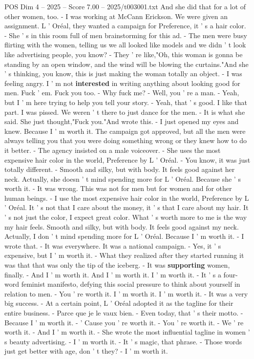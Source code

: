 \begin{textsample}{POS Dim 4 – 2025 – Score 7.00 – 2025/t003001.txt}
And she did that for a lot of other women, too. - I was working at McCann Erickson.
We were given an assignment.
L ' Oréal, they wanted a campaign for Preference, it ' s a hair color. - She ' s in this room full of men brainstorming for this ad. - The men were busy flirting with the women, telling us we all looked like models and we didn ' t look like advertising people, you know? - They ' re like,"Oh, this woman is gonna be standing by an open window, and the wind will be blowing the curtains."And she ' s thinking, you know, this is just making the woman totally an object. - I was feeling angry.
I ' m not \textbf{interested} in writing anything about looking good for men.
Fuck ' em.
Fuck you too. - Why fuck me? - Well, you ' re a man. - Yeah, but I ' m here trying to help you tell your story. - Yeah, that ' s good.
I like that part.
I was pissed.
We weren ' t there to just dance for the men. - It is what she said.
She just thought,"Fuck you."And wrote this. - I just opened my eyes and knew.
Because I ' m worth it.
The campaign got approved, but all the men were always telling you that you were doing something wrong or they knew how to do it better. - The agency insisted on a male voiceover. - She uses the most expensive hair color in the world, Preference by L ' Oréal. - You know, it was just totally different. - Smooth and silky, but with body.
It feels good against her neck.
Actually, she doesn ' t mind spending more for L ' Oréal.
Because she ' s worth it. - It was wrong.
This was not for men but for women and for other human beings. - I use the most expensive hair color in the world, Preference by L ' Oréal.
It ' s not that I care about the money, it ' s that I care about my hair.
It ' s not just the color, I expect great color.
What ' s worth more to me is the way my hair feels.
Smooth and silky, but with body.
It feels good against my neck.
Actually, I don ' t mind spending more for L ' Oréal.
Because I ' m worth it. - I wrote that. - It was everywhere.
It was a national campaign. - Yes, it ' s expensive, but I ' m worth it. - What they realized after they started running it was that that was only the tip of the iceberg. - It was \textbf{supporting} women, finally. - And I ' m worth it.
And I ' m worth it.
I ' m worth it. - It ' s a four-word feminist manifesto, defying this social pressure to think about yourself in relation to men. - You ' re worth it.
I ' m worth it.
I ' m worth it. - It was a very big success. - At a certain point, L ' Oréal adopted it as the tagline for their entire business. - Parce que je le vaux bien. - Even today, that ' s their motto. - Because I ' m worth it. - ' Cause you ' re worth it. - You ' re worth it. - We ' re worth it. - And I ' m worth it. - She wrote the most influential tagline in women ' s beauty advertising. - I ' m worth it. - It ' s magic, that phrase. - Those words just get better with age, don ' t they? - I ' m worth it.

\end{textsample}
